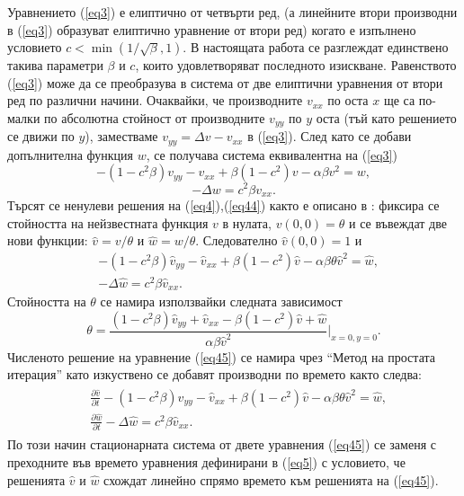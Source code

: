 \documentclass{article}
\newcommand{\rf}[1]{(\ref{#1})}
\theoremstyle{remark}
\begin{document}
Уравнението \rf{eq3} е елиптично от четвърти ред, (а линейните втори производни в \rf{eq3} образуват елиптично уравнение от втори ред) когато е изпълнено условието $c < \min (1/ \sqrt{\beta},1)$. В настоящата работа се разглеждат единствено такива параметри $\beta$ и $c$, които удовлетворяват последното изискване.
Равенството \rf{eq3} може да се преобразува в система от две елиптични уравнения от втори ред по различни начини. Очаквайки, че производните $v_{xx}$ по оста $x$ ще са по-малки по абсолютна стойност от производните $v_{yy}$ по $y$ оста (тъй като решението се движи по $y$), заместваме $v_{yy} = \Delta v- v_{xx}$ в \rf{eq3}. След като се добави допълнителна функция $w$, се получава система еквивалентна на \rf{eq3}
\begin{equation}\label{eq4}
- (1- c^2 \beta) v_{yy} - v_{xx} + \beta (1-c^2) v - \alpha \beta v^2 = w, 
\end{equation}
\begin{equation}\label{eq44}
 - \Delta w = c^2 \beta v_{xx}. 
\end{equation}
Търсят се ненулеви решения на \rf{eq4},\rf{eq44} както е описано в \cite{ref116, ref117}: фиксира се стойността на нейзвестната функция $v$ в нулата, $v(0,0)=\theta$ и се въвеждат две нови функции: $\widehat{v}=v/{\theta} $ и $\widehat{w}=w/{\theta} $. Следователно $\widehat{v}(0,0)=1$ и 
\begin{equation}\label{eq45}
\begin{split}
 &- (1 - c^2 \beta) \widehat{v}_{yy} -\widehat{v}_{xx} + \beta (1-c^2) \widehat{v} - \alpha \beta \theta \widehat{v}^2 = \widehat{w}, \\
 &- \Delta \widehat{w} =  c^2 \beta \widehat{v}_{xx}.
\end{split}
\end{equation}
Стойността на $\theta$ се намира използвайки следната зависимост
\begin{equation}\label{eqtheta}
\theta = \frac{ (1-c^2 \beta) \widehat{v}_{yy} + \widehat{v}_{xx} - \beta (1-c^2) \widehat{v} +\widehat{w}}{\alpha \beta \widehat{v}^2 } |_{x=0,y=0}.
\end{equation}
Численото решение на уравнение \rf{eq45} се намира чрез ``Метод на простата итерация'' като изкуствено се добавят производни по времето както следва:
\begin{align}\label{eq5}
\begin{split}
 &\frac {\partial \widehat{v}}{\partial t} - (1 - c^2 \beta) \widehat{v}_{yy} -\widehat{v}_{xx} + \beta (1-c^2) \widehat{v} - \alpha \beta \theta \widehat{v}^2 = \widehat{w}, \\
 &\frac {\partial \widehat{w}}{\partial t} - \Delta \widehat{w} =  c^2 \beta \widehat{v}_{xx}. 
\end{split}
\end{align}
По този начин стационарната система от двете уравнения \rf{eq45} се заменя с преходните във времето уравнения дефинирани в \rf{eq5} с условието, че решенията $\widehat{v}$ и $\widehat{w}$ схождат линейно спрямо времето към решенията на \rf{eq45}.
\end{document}
